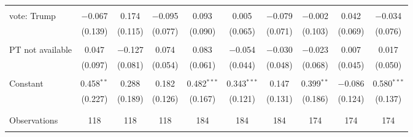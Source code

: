 \begin{tabular}{@{\extracolsep{5pt}}lccccccccc}
  & & & & & & & & & \\ 
 vote: Trump & $-$0.067 & 0.174 & $-$0.095 & 0.093 & 0.005 & $-$0.079 & $-$0.002 & 0.042 & $-$0.034 \\ 
  & (0.139) & (0.115) & (0.077) & (0.090) & (0.065) & (0.071) & (0.103) & (0.069) & (0.076) \\ 
  & & & & & & & & & \\ 
 PT not available & 0.047 & $-$0.127 & 0.074 & 0.083 & $-$0.054 & $-$0.030 & $-$0.023 & 0.007 & 0.017 \\ 
  & (0.097) & (0.081) & (0.054) & (0.061) & (0.044) & (0.048) & (0.068) & (0.045) & (0.050) \\ 
  & & & & & & & & & \\ 
 Constant & 0.458$^{**}$ & 0.288 & 0.182 & 0.482$^{***}$ & 0.343$^{***}$ & 0.147 & 0.399$^{**}$ & $-$0.086 & 0.580$^{***}$ \\ 
  & (0.227) & (0.189) & (0.126) & (0.167) & (0.121) & (0.131) & (0.186) & (0.124) & (0.137) \\ 
  & & & & & & & & & \\ 
\hline \\[-1.8ex] 

Observations & 118 & 118 & 118 & 184 & 184 & 184 & 174 & 174 & 174 \\ 
\hline 
\hline \\[-1.8ex] 
\end{tabular} 